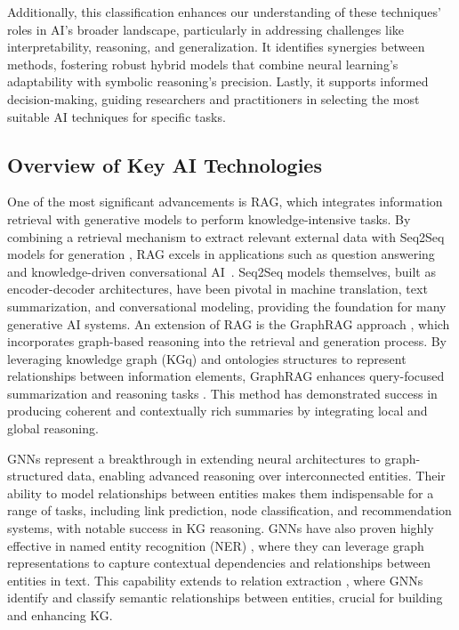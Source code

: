 \documentclass[12pt]{article}
\begin{document}
Additionally, this classification enhances our understanding of these techniques’ roles in AI’s broader landscape, particularly in addressing challenges like interpretability, reasoning, and generalization. It identifies synergies between methods, fostering robust hybrid models that combine neural learning’s adaptability with symbolic reasoning’s precision. Lastly, it supports informed decision-making, guiding researchers and practitioners in selecting the most suitable AI techniques for specific tasks.

\subsection{Overview of Key AI Technologies}

One of the most significant advancements is RAG, which integrates information retrieval with generative models to perform knowledge-intensive tasks. By combining a retrieval mechanism to extract relevant external data with Seq2Seq models for generation \cite{yin2022seq2seq}, RAG excels in applications such as question answering and knowledge-driven conversational AI~\cite{yang2024rag}. Seq2Seq models themselves, built as encoder-decoder architectures, have been pivotal in machine translation, text summarization, and conversational modeling, providing the foundation for many generative AI systems. An extension of RAG is the GraphRAG approach \cite{edge2024local}, which incorporates graph-based reasoning into the retrieval and generation process. By leveraging knowledge graph (KGq) and ontologies structures to represent relationships between information elements, GraphRAG enhances query-focused summarization and reasoning tasks \cite{chen2020review, antoniou2009web}. This method has demonstrated success in producing coherent and contextually rich summaries by integrating local and global reasoning.

GNNs \cite{mavromatis2024gnn} represent a breakthrough in extending neural architectures to graph-structured data, enabling advanced reasoning over interconnected entities. Their ability to model relationships between entities makes them indispensable for a range of tasks, including link prediction, node classification, and recommendation systems, with notable success in KG reasoning. GNNs have also proven highly effective in named entity recognition (NER) \cite{roy2021recent}, where they can leverage graph representations to capture contextual dependencies and relationships between entities in text. This capability extends to relation extraction \cite{wu2024towards}, where GNNs identify and classify semantic relationships between entities, crucial for building and enhancing KG. 
\end{document}
